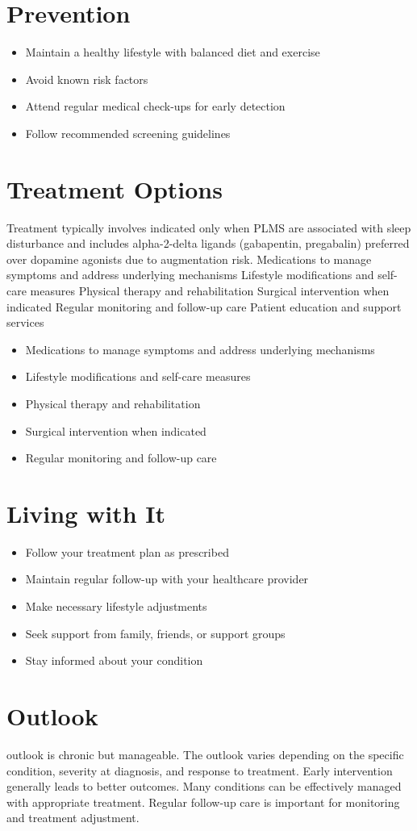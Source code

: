 \section{Prevention}
\begin{itemize}[noitemsep]
  \item Maintain a healthy lifestyle with balanced diet and exercise
  \item Avoid known risk factors
  \item Attend regular medical check-ups for early detection
  \item Follow recommended screening guidelines
\end{itemize}
\section{Treatment Options}
Treatment typically involves indicated only when PLMS are associated with sleep disturbance and includes alpha-2-delta ligands (gabapentin, pregabalin) preferred over dopamine agonists due to augmentation risk. Medications to manage symptoms and address underlying mechanisms Lifestyle modifications and self-care measures Physical therapy and rehabilitation Surgical intervention when indicated Regular monitoring and follow-up care Patient education and support services

\begin{itemize}[noitemsep]
  \item Medications to manage symptoms and address underlying mechanisms
  \item Lifestyle modifications and self-care measures
  \item Physical therapy and rehabilitation
  \item Surgical intervention when indicated
  \item Regular monitoring and follow-up care
\end{itemize}
\section{Living with It}
\begin{itemize}[noitemsep]
  \item Follow your treatment plan as prescribed
  \item Maintain regular follow-up with your healthcare provider
  \item Make necessary lifestyle adjustments
  \item Seek support from family, friends, or support groups
  \item Stay informed about your condition
\end{itemize}
\section{Outlook}
outlook is chronic but manageable. The outlook varies depending on the specific condition, severity at diagnosis, and response to treatment. Early intervention generally leads to better outcomes. Many conditions can be effectively managed with appropriate treatment. Regular follow-up care is important for monitoring and treatment adjustment.
